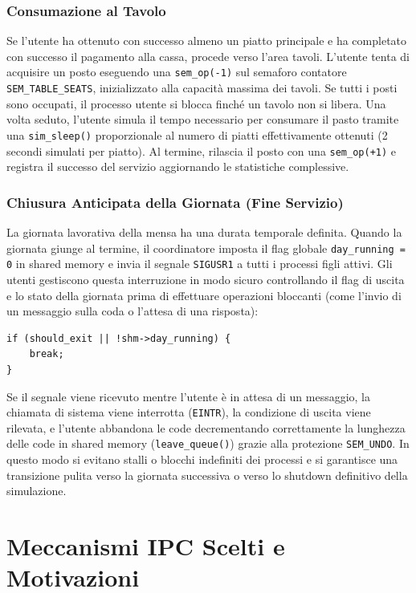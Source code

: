 \documentclass[a4paper,12pt]{article}
\begin{document}
\subsubsection{Consumazione al Tavolo}
Se l'utente ha ottenuto con successo almeno un piatto principale e ha completato con successo il pagamento alla cassa, procede verso l'area tavoli.
L'utente tenta di acquisire un posto eseguendo una \texttt{sem\_op(-1)} sul semaforo contatore \texttt{SEM\_TABLE\_SEATS}, inizializzato alla capacità massima dei tavoli. Se tutti i posti sono occupati, il processo utente si blocca finché un tavolo non si libera. Una volta seduto, l'utente simula il tempo necessario per consumare il pasto tramite una \texttt{sim\_sleep()} proporzionale al numero di piatti effettivamente ottenuti (2 secondi simulati per piatto). Al termine, rilascia il posto con una \texttt{sem\_op(+1)} e registra il successo del servizio aggiornando le statistiche complessive.

\subsubsection{Chiusura Anticipata della Giornata (Fine Servizio)}
La giornata lavorativa della mensa ha una durata temporale definita. Quando la giornata giunge al termine, il coordinatore imposta il flag globale \texttt{day\_running = 0} in shared memory e invia il segnale \texttt{SIGUSR1} a tutti i processi figli attivi.
Gli utenti gestiscono questa interruzione in modo sicuro controllando il flag di uscita e lo stato della giornata prima di effettuare operazioni bloccanti (come l'invio di un messaggio sulla coda o l'attesa di una risposta):
\begin{lstlisting}[caption={Controllo di terminazione giornaliera nel ciclo utente.}]
if (should_exit || !shm->day_running) {
    break;
}
\end{lstlisting}
Se il segnale viene ricevuto mentre l'utente è in attesa di un messaggio, la chiamata di sistema viene interrotta (\texttt{EINTR}), la condizione di uscita viene rilevata, e l'utente abbandona le code decrementando correttamente la lunghezza delle code in shared memory (\texttt{leave\_queue()}) grazie alla protezione \texttt{SEM\_UNDO}. In questo modo si evitano stalli o blocchi indefiniti dei processi e si garantisce una transizione pulita verso la giornata successiva o verso lo shutdown definitivo della simulazione.


\section{Meccanismi IPC Scelti e Motivazioni}
\end{document}
